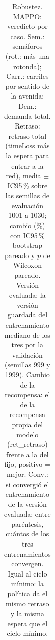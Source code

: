 \begin{table}[H]
\begin{tabular}{llcrrrrrrcl}
\bottomrule
\end{tabular}
\caption[Robustez: veredicto de MAPPO]{Robustez. MAPPO: veredicto por caso. Sem.: semáforos (rot.: más una rotonda); Carr.: carriles por sentido de la avenida; Dem.: demanda total. Retraso: retraso total (timeLoss más la espera para entrar a la red), media $\pm$ IC95\,\% sobre las semillas de evaluación 1001 a 1030; cambio (\%) con IC95\,\% bootstrap pareado y $p$ de Wilcoxon pareado. Versión evaluada: la versión guardada del entrenamiento mediano de los tres por la validación (semillas 999 y 1999). Cambio de la recompensa: el de la recompensa propia del modelo (ret\_retraso) frente a la del fijo, positivo = mejor. Conv.: si convergió el entrenamiento de la versión evaluada; entre paréntesis, cuántos de los tres entrenamientos convergen. Igual al ciclo mínimo: la política da el mismo retraso y la misma espera que el ciclo mínimo.}
\label{tab:robustez-veredicto-mappo}
\end{table}
